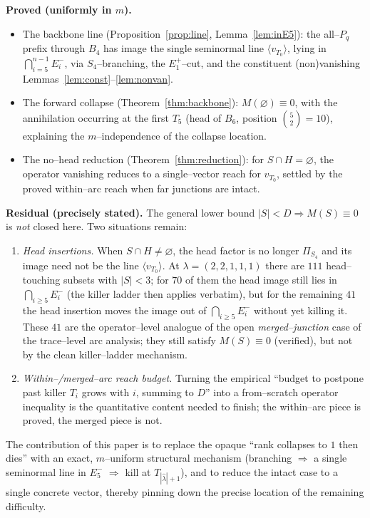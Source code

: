 \documentclass[11pt]{article}
\theoremstyle{definition}
\newcommand{\Pq}{P_{q}}
\newcommand{\la}{\lambda}
\newcommand{\Ep}[1]{E^{+}_{#1}}
\newcommand{\Em}[1]{E^{-}_{#1}}
\begin{document}
\textbf{Proved (uniformly in $m$).}
\begin{itemize}
\item The backbone line (Proposition~\ref{prop:line}, Lemma~\ref{lem:inE5}): the all--$\Pq$
prefix through $B_4$ has image the single seminormal line $\langle v_{T_0}\rangle$, lying
in $\bigcap_{i=5}^{n-1}\Em i$, via $S_4$--branching, the $\Ep1$--cut, and the constituent
(non)vanishing Lemmas~\ref{lem:const}--\ref{lem:nonvan}.
\item The forward collapse (Theorem~\ref{thm:backbone}): $M(\varnothing)\equiv0$, with the
annihilation occurring at the first $T_5$ (head of $B_6$, position $\binom52=10$),
explaining the $m$--independence of the collapse location.
\item The no--head reduction (Theorem~\ref{thm:reduction}): for $S\cap H=\varnothing$, the
operator vanishing reduces to a single--vector reach for $v_{T_0}$, settled by the proved
within--arc reach when far junctions are intact.
\end{itemize}

\textbf{Residual (precisely stated).} The general lower bound $|S|<D\Rightarrow
M(S)\equiv0$ is \emph{not} closed here. Two situations remain:
\begin{enumerate}
\item \emph{Head insertions.} When $S\cap H\neq\varnothing$, the head factor is no longer
$\Pi_{S_4}$ and its image need not be the line $\langle v_{T_0}\rangle$. At
$\la=(2,2,1,1,1)$ there are $111$ head--touching subsets with $|S|<3$; for $70$ of them the
head image still lies in $\bigcap_{i\ge5}\Em i$ (the killer ladder then applies verbatim),
but for the remaining $41$ the head insertion moves the image out of $\bigcap_{i\ge5}\Em i$
without yet killing it. These $41$ are the operator--level analogue of the open
\emph{merged--junction} case of the trace--level arc analysis; they still satisfy
$M(S)\equiv0$ (verified), but not by the clean killer--ladder mechanism.
\item \emph{Within--/merged--arc reach budget.} Turning the empirical ``budget to postpone
past killer $T_i$ grows with $i$, summing to $D$'' into a from--scratch operator inequality
is the quantitative content needed to finish; the within--arc piece is proved, the merged
piece is not.
\end{enumerate}
The contribution of this paper is to replace the opaque ``rank collapses to $1$ then dies''
with an exact, $m$--uniform structural mechanism (branching $\Rightarrow$ a single
seminormal line in $\Em5$ $\Rightarrow$ kill at $T_{|\hat\la|+1}$), and to reduce the
intact case to a single concrete vector, thereby pinning down the precise location of the
remaining difficulty.
\end{document}
